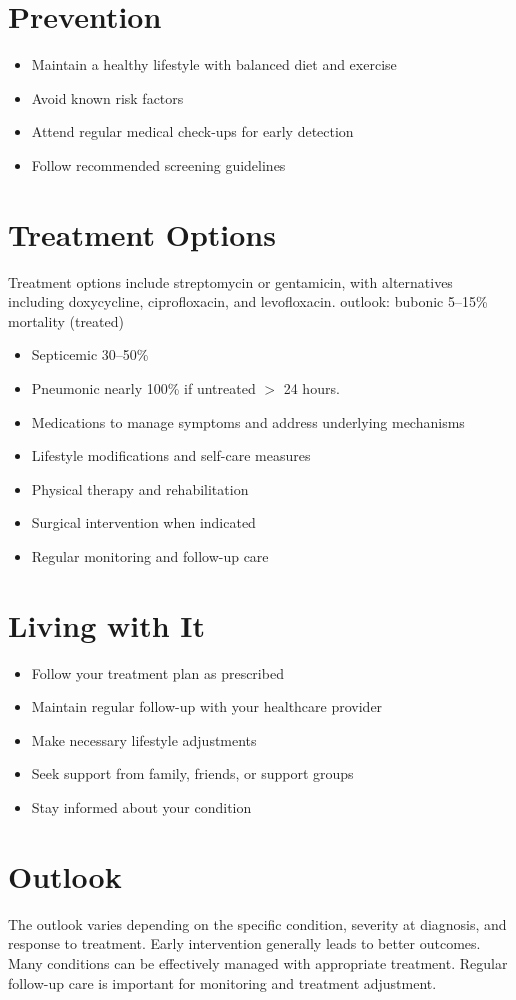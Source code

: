 \section{Prevention}
\begin{itemize}[noitemsep]
  \item Maintain a healthy lifestyle with balanced diet and exercise
  \item Avoid known risk factors
  \item Attend regular medical check-ups for early detection
  \item Follow recommended screening guidelines
\end{itemize}
\section{Treatment Options}
Treatment options include streptomycin or gentamicin, with alternatives including doxycycline, ciprofloxacin, and levofloxacin. outlook: bubonic 5--15\% mortality (treated)

\begin{itemize}[noitemsep]
  \item Septicemic 30--50\%
  \item Pneumonic nearly 100\% if untreated $>$ 24 hours.
  \item Medications to manage symptoms and address underlying mechanisms
  \item Lifestyle modifications and self-care measures
  \item Physical therapy and rehabilitation
  \item Surgical intervention when indicated
  \item Regular monitoring and follow-up care
\end{itemize}
\section{Living with It}
\begin{itemize}[noitemsep]
  \item Follow your treatment plan as prescribed
  \item Maintain regular follow-up with your healthcare provider
  \item Make necessary lifestyle adjustments
  \item Seek support from family, friends, or support groups
  \item Stay informed about your condition
\end{itemize}
\section{Outlook}
The outlook varies depending on the specific condition, severity at diagnosis, and response to treatment. Early intervention generally leads to better outcomes. Many conditions can be effectively managed with appropriate treatment. Regular follow-up care is important for monitoring and treatment adjustment.
